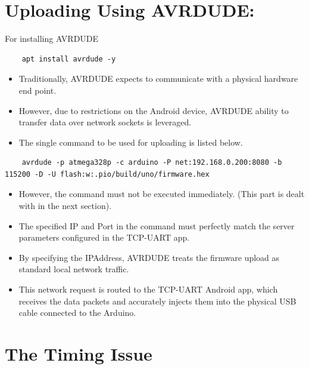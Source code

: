 \documentclass[conference]{IEEEtran} %
\begin{document}
\section{Uploading Using AVRDUDE:}

For installing AVRDUDE
\begin{lstlisting}
    apt install avrdude -y  
\end{lstlisting}

\begin{itemize}
    \item Traditionally, AVRDUDE expects to communicate with a physical hardware end point. 
    \item However, due to restrictions on the Android device, AVRDUDE ability to transfer data over network sockets is leveraged. 
    \item The single command to be used for uploading is listed below. 
\end{itemize}

\begin{lstlisting}
    avrdude -p atmega328p -c arduino -P net:192.168.0.200:8080 -b 115200 -D -U flash:w:.pio/build/uno/firmware.hex
\end{lstlisting}

\begin{itemize}
    \item However, the command must not be executed immediately. (This part is dealt with in the next section). 
    \item The specified IP and Port in the command must perfectly match the server parameters configured in the TCP-UART app. 
    \item By specifying the IPAddress, AVRDUDE treats the firmware upload as standard local network traffic.
    \item This network request is routed to the TCP-UART Android app, which receives the data packets and accurately injects them into the physical USB cable connected to the Arduino.
\end{itemize}

\section{The Timing Issue}
\end{document}

